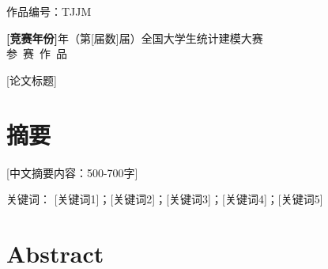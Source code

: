 ﻿\documentclass[UTF8,a4paper,zihao=-4,AutoFakeBold]{ctexart}
\newcommand{\fsgb}{\fangsong}
\newcommand{\fzxbsong}{\songti}
\begin{document}
\thispagestyle{empty}
{\heiti{} 作品编号：TJJM}\par
\vspace*{5.5cm}
\begin{center}
\fzxbsong
{ \textbf{[竞赛年份]}年（第[届数]届）全国大学生统计建模大赛}\\
\vspace*{20pt}
{参~赛~作~品}
\end{center}\par
\vspace*{4.5cm}
\begin{table}[h]
\centering
{}
\fsgb
\renewcommand{\arraystretch}{2}
\end{table}

\clearpage
\begin{center}
\fzxbsong\setlength{\baselineskip}{24pt}
[论文标题]
\end{center}

\section*{\centering\heiti{} 摘要}
\songti{}

[中文摘要内容：500-700字]

\heiti{}\setlength{\baselineskip}{24pt} 关键词：
\songti{}\setlength{\baselineskip}{24pt} [关键词1]；[关键词2]；[关键词3]；[关键词4]；[关键词5]

\clearpage
\section*{\centering\bfseries{} Abstract}
\end{document}
